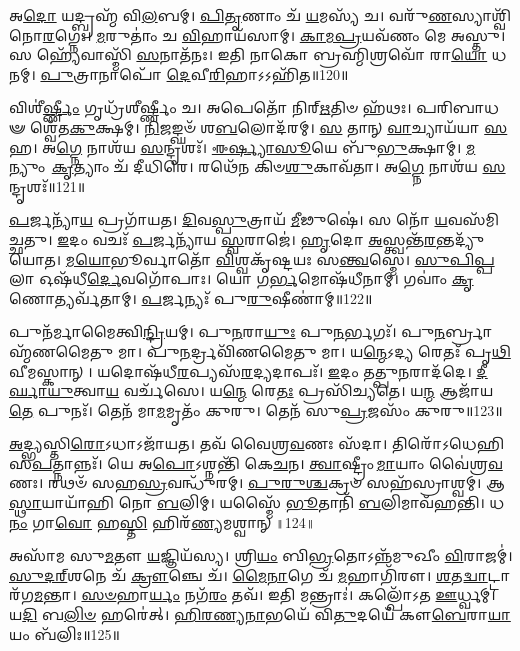 𑌅\-\ul{𑌦𑍋} 𑌯𑌦𑍍𑌬𑍍𑌰𑌹𑍍𑌮᳴ 𑌵𑌿\-\ul{𑌲}\-𑌬𑌮𑍍। \ul{𑌪𑌿}\-\-\ul{𑌤𑍃}\-𑌣𑌾𑌂 𑌚᳴ \ul{𑌯}\-𑌮𑌸𑍍𑌯᳴ 𑌚। 
𑌵𑌰𑍁᳴\-\ul{𑌣}\-𑌸𑍍𑌯𑌾𑌶𑍍𑌵𑌿᳴𑌨𑍋\-\ul{𑌰}\-𑌗𑍍𑌨𑍇𑌃। \ul{𑌮}\-𑌰𑍁𑌤𑌾𑌂॑ 𑌚 \ul{𑌵𑌿}\-𑌹𑌾𑌯᳴𑌸𑌾𑌮𑍍। 
\-\ul{𑌕𑌾}\-\-\ul{𑌮}\-\-\ul{𑌪𑍍𑌰}\-𑌯𑌵᳴𑌣𑌂 𑌮𑍇 𑌅𑌸𑍍𑌤𑍁। 𑌸 𑌹𑍍𑌯𑍇᳴𑌵𑌾𑌸𑍍𑌮𑌿᳴ \ul{𑌸}\-𑌨𑌾𑌤᳴𑌨𑌃। 
𑌇𑌤𑌿 𑌨𑌾𑌕𑍋 𑌬𑍍𑌰𑌹𑍍𑌮𑌿𑌶𑍍𑌰𑌵𑍋᳴ 𑌰𑌾\-\ul{𑌯𑍋} 𑌧𑌨𑌮𑍍। \ul{𑌪𑍁}\-𑌤𑍍𑌰𑌾𑌨𑌾𑌪𑍋᳴ \ul{𑌦𑍇}\-𑌵𑍀\-\ul{𑌰𑌿}\-𑌹𑌾𑌽𑌽𑌹𑌿᳴𑌤॥120॥\anuvakamend


𑌵𑌿𑌶𑍀॑\-\ul{𑌰𑍍𑌷𑍍𑌣𑍀𑌂} 𑌗𑍃𑌧𑍍𑌰᳴𑌶𑍀𑌰𑍍𑌷𑍍𑌣𑍀𑌂 𑌚। 𑌅𑌪𑍇𑌤𑍋᳴ 𑌨𑌿𑌰𑍍‌\-\ul{𑌋}\-𑌤𑌿𑍞 𑌹᳴𑌥𑌃। 
𑌪𑌰𑌿𑌬𑌾𑌧𑍟 𑌶𑍍𑌵𑍇᳴𑌤\-\ul{𑌕𑍁}\-𑌕𑍍𑌷𑌮𑍍। \ul{𑌨𑌿}\-𑌜𑌙𑍍𑌘𑍞᳴ 𑌶\-\ul{𑌬}\-𑌲𑍋𑌦᳴𑌰𑌮𑍍। 
\-\ul{𑌸} 𑌤𑌾𑌨𑍍‌ \ul{𑌵𑌾}\-𑌚𑍍𑌯𑌾𑌯᳴𑌯𑌾 \ul{𑌸}\-𑌹। 𑌅\-\ul{𑌗𑍍𑌨𑍇} 𑌨𑌾𑌶᳴𑌯 \ul{𑌸}\-𑌨𑍍𑌦𑍃𑌶𑌃᳴। 
\-\ul{𑌈}\-\-\ul{𑌰𑍍𑌷𑍍𑌯𑌾}\-\-\ul{𑌸𑍂}\-𑌯𑍇 𑌬𑍁᳴\-\ul{𑌭𑍁}\-𑌕𑍍𑌷𑌾𑌮𑍍। \ul{𑌮}\-𑌨𑍍𑌯𑍁𑌂 \ul{𑌕𑍃}\-𑌤𑍍𑌯𑌾𑌂 𑌚᳴ 𑌦𑍀𑌧𑌿𑌰𑍇। 
𑌰𑌥𑍇᳴𑌨 𑌕𑌿𑍞\-\ul{𑌶𑍁}\-𑌕𑌾𑌵᳴𑌤𑌾। 𑌅\-\ul{𑌗𑍍𑌨𑍇} 𑌨𑌾𑌶᳴𑌯 \ul{𑌸}\-𑌨𑍍𑌦𑍃𑌶𑌃᳴॥121॥\anuvakamend


\-\ul{𑌪}\-𑌰𑍍𑌜𑌨𑍍𑌯𑌾᳴\-\ul{𑌯} 𑌪𑍍𑌰𑌗𑌾᳴𑌯𑌤। \ul{𑌦𑌿}\-𑌵\-\ul{𑌸𑍍𑌪𑍁}\-𑌤𑍍𑌰𑌾𑌯᳴ \ul{𑌮𑍀}\-𑌢𑍁𑌷𑍇॑। 
𑌸 𑌨𑍋᳴ \ul{𑌯}\-𑌵𑌸᳴𑌮𑌿𑌚𑍍𑌛𑌤𑍁। \ul{𑌇}\-𑌦𑌂 𑌵𑌚𑌃᳴ \ul{𑌪}\-𑌰𑍍𑌜𑌨𑍍𑌯𑌾᳴𑌯 \ul{𑌸𑍍𑌵}\-𑌰𑌾𑌜𑍇॑। 
\-\ul{𑌹𑍃}\-𑌦𑍋 \ul{𑌅}\-𑌸𑍍𑌤𑍍𑌵𑌨𑍍𑌤᳴\-\ul{𑌰}\-𑌨𑍍𑌤𑌦𑍍𑌯𑍁᳴𑌯𑍋𑌤। \ul{𑌮}\-\-\ul{𑌯𑍋}\-𑌭𑍂𑌰𑍍𑌵𑌾𑌤𑍋᳴ \ul{𑌵𑌿}\-𑌶𑍍𑌵𑌕𑍃᳴𑌷𑍍𑌟𑌯𑌃 𑌸\-\ul{𑌨𑍍𑌤𑍍𑌵}\-𑌸𑍍𑌮𑍇। 
\-\ul{𑌸𑍁}\-\-\ul{𑌪𑌿}\-\-\ul{𑌪𑍍𑌪}\-𑌲𑌾 𑌓𑌷᳴𑌧𑍀\-\ul{𑌰𑍍𑌦𑍇}\-𑌵𑌗𑍋᳴𑌪𑌾𑌃। 𑌯𑍋 𑌗\-\ul{𑌰𑍍𑌭}\-𑌮𑍋𑌷᳴𑌧𑍀𑌨𑌾𑌮𑍍। 
𑌗𑌵𑌾𑌂॑ \ul{𑌕𑍃}\-𑌣𑍋𑌤𑍍𑌯𑌰𑍍𑌵᳴𑌤𑌾𑌮𑍍। \ul{𑌪}\-𑌰𑍍𑌜𑌨𑍍𑌯𑌃᳴ 𑌪𑍁\-\ul{𑌰𑍁}\-𑌷𑍀𑌣𑌾॑𑌮𑍍॥122॥\anuvakamend


𑌪𑍁𑌨᳴𑌰𑍍𑌮𑌾𑌮𑍈𑌤𑍍𑌵𑌿\-\ul{𑌨𑍍𑌦𑍍𑌰𑌿}\-𑌯𑌮𑍍। 𑌪𑍁\-\ul{𑌨}\-𑌰𑌾\-\ul{𑌯𑍁𑌃} 𑌪𑍁\-\ul{𑌨}\-𑌰𑍍𑌭𑌗𑌃᳴। 
𑌪𑍁\-\ul{𑌨}\-𑌰𑍍𑌬𑍍𑌰𑌾𑌹𑍍𑌮᳴𑌣𑌮𑍈𑌤𑍁 𑌮𑌾। 𑌪𑍁\-\ul{𑌨}\-𑌰𑍍𑌦𑍍𑌰𑌵𑌿᳴𑌣𑌮𑍈𑌤𑍁 𑌮𑌾। 
𑌯\-\ul{𑌨𑍍𑌮𑍇}\-𑌽𑌦𑍍𑌯 𑌰𑍇𑌤𑌃᳴ 𑌪𑍃\-\ul{𑌥𑌿}\-𑌵𑍀𑌮𑌸𑍍𑌕𑌾𑌨𑍍। 𑌯𑌦𑍋𑌷᳴𑌧𑍀\-\ul{𑌰}\-𑌪𑍍𑌯𑌸᳴\-\ul{𑌰}\-𑌦𑍍𑌯𑌦𑌾𑌪𑌃᳴। 
\-\ul{𑌇}\-𑌦𑌂 𑌤𑌤𑍍𑌪𑍁\-\ul{𑌨}\-𑌰𑌾𑌦᳴𑌦𑍇। \ul{𑌦𑍀}\-\-\ul{𑌰𑍍𑌘𑌾}\-\-\ul{𑌯𑍁}\-𑌤𑍍𑌵𑌾\-\ul{𑌯} 𑌵𑌰𑍍𑌚᳴𑌸𑍇। 
𑌯\-\ul{𑌨𑍍𑌮𑍇} 𑌰𑍇\-\ul{𑌤𑌃} 𑌪𑍍𑌰𑌸𑌿᳴𑌚𑍍𑌯𑌤𑍇। 𑌯\-\ul{𑌨𑍍𑌮} 𑌆𑌜𑌾᳴𑌯\-\ul{𑌤𑍇} 𑌪𑍁𑌨𑌃᳴। 
𑌤𑍇𑌨᳴ 𑌮𑌾\-\ul{𑌮}\-𑌮𑍃𑌤𑌂᳴ 𑌕𑍁𑌰𑍁। 𑌤𑍇𑌨᳴ 𑌸𑍁\-\ul{𑌪𑍍𑌰}\-𑌜𑌸𑌂᳴ 𑌕𑍁𑌰𑍁॥123॥\anuvakamend


\-\ul{𑌅}\-𑌦𑍍𑌭𑍍𑌯𑌸𑍍𑌤𑌿\-\ul{𑌰𑍋}\-𑌽𑌧𑌾𑌽𑌜𑌾᳴𑌯𑌤। 𑌤𑌵᳴ 𑌵𑍈𑌶𑍍𑌰\-\ul{𑌵}\-𑌣𑌃 𑌸᳴𑌦𑌾। 
𑌤𑌿𑌰𑍋᳴𑌽𑌧𑍇𑌹𑌿 𑌸\-\ul{𑌪}\-𑌤𑍍𑌨𑌾𑌨𑍍𑌨𑌃᳴। 𑌯𑍇 𑌅\-\ul{𑌪𑍋}\-𑌽𑌶𑍍𑌨𑌨𑍍𑌤𑌿᳴ 𑌕𑍇\-\ul{𑌚}\-𑌨। 
\-\ul{𑌤𑍍𑌵𑌾}\-𑌷𑍍𑌟𑍍𑌰𑍀𑌂 \ul{𑌮𑌾}\-𑌯𑌾𑌂 𑌵𑍈॑𑌶𑍍𑌰\-\ul{𑌵}\-𑌣𑌃। 𑌰𑌥𑍞᳴ 𑌸𑌹\-\ul{𑌸𑍍𑌰}\-𑌵𑌨𑍍𑌧𑍁᳴𑌰𑌮𑍍। 
\-\ul{𑌪𑍁}\-\-\ul{𑌰𑍁}\-\-\ul{𑌶𑍍𑌚}\-𑌕𑍍𑌰𑍞 𑌸𑌹᳴𑌸𑍍𑌰𑌾𑌶𑍍𑌵𑌮𑍍। 𑌆\-\ul{𑌸𑍍𑌥𑌾}\-𑌯𑌾𑌯𑌾᳴𑌹𑌿 𑌨𑍋 \ul{𑌬}\-𑌲𑌿𑌮𑍍। 
𑌯𑌸𑍍𑌮𑍈᳴ \ul{𑌭𑍂}\-𑌤𑌾𑌨𑌿᳴ \ul{𑌬}\-𑌲𑌿𑌮𑌾𑌵᳴𑌹𑌨𑍍𑌤𑌿। 𑌧\-\ul{𑌨𑌂} 𑌗𑌾\-\ul{𑌵𑍋} 𑌹\-\ul{𑌸𑍍𑌤𑌿} 𑌹𑌿𑌰᳴\-\ul{𑌣𑍍𑌯}\-𑌮𑌶𑍍𑌵𑌾𑌨𑍍॥124॥


𑌅𑌸𑌾᳴𑌮 𑌸𑍁\-\ul{𑌮}\-𑌤𑍗 \ul{𑌯}\-𑌜𑍍𑌞𑌿𑌯᳴𑌸𑍍𑌯। 𑌶𑍍𑌰𑌿\-\ul{𑌯𑌂} 𑌬𑌿\-\ul{𑌭𑍍𑌰}\-𑌤𑍋𑌽𑌨𑍍𑌨᳴𑌮𑍁𑌖𑍀𑌂 \ul{𑌵𑌿}\-𑌰𑌾𑌜𑌮𑍍‌॑। 
\-\ul{𑌸𑍁}\-\-\ul{𑌦}\-\ul{𑌰𑍍}‌𑌶𑌨𑍇 𑌚᳴ \ul{𑌕𑍍𑌰𑍗}\-𑌞𑍍𑌚𑍇 𑌚᳴। \ul{𑌮𑍈}\-\-\ul{𑌨𑌾}\-𑌗𑍇 𑌚᳴ \ul{𑌮}\-𑌹𑌾𑌗𑌿᳴𑌰𑍗। 
\-\ul{𑌶}\-𑌤\-\ul{𑌦𑍍𑌵𑌾}\-𑌟𑍍𑌟𑌾𑌰᳴𑌗\-\ul{𑌮}\-𑌨𑍍𑌤𑌾। \ul{𑌸}\-\-\ul{𑍞}\-𑌹𑌾\-\ul{𑌰𑍍𑌯𑌂} 𑌨𑌗᳴\-\ul{𑌰𑌂} 𑌤𑌵᳴। 
𑌇𑌤𑌿 𑌮𑌨𑍍𑌤𑍍𑌰𑌾𑌃॑। 𑌕𑌲𑍍𑌪𑍋᳴𑌽𑌤 \ul{𑌊}\-𑌰𑍍𑌧𑍍𑌵𑌮𑍍। 𑌯\-\ul{𑌦𑌿} 𑌬\-\ul{𑌲𑌿}\-\-\ul{𑍞} 𑌹𑌰𑍇॑𑌤𑍍। 
\-\ul{𑌹𑌿}\-\-\ul{𑌰}\-\-\ul{𑌣𑍍𑌯}\-\-\ul{𑌨𑌾}\-𑌭𑌯𑍇᳴ 𑌵𑌿\-\ul{𑌤𑍁}\-𑌦𑌯𑍇᳴ 𑌕𑍗\-\ul{𑌬𑍇}\-𑌰𑌾\-\ul{𑌯𑌾}\-𑌯𑌂 𑌬᳴𑌲𑌿𑌃॥125॥


